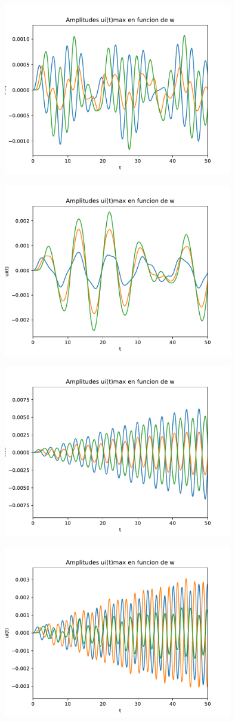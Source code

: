 \documentclass[11pt,letterpaper]{exam}
\begin{document}
\begin{center}
\includegraphics[width=10cm]{PrimeraGraficaUi(t).pdf}
\end{center}

\begin{center}
\includegraphics[width=10cm]{SegundaGraficaUi(t).pdf}
\end{center}

\begin{center}
\includegraphics[width=10cm]{TerceraGraficaUi(t).pdf}
\end{center}

\begin{center}
\includegraphics[width=10cm]{CuartaGraficaUi(t).pdf}
\end{center}
\end{document}
